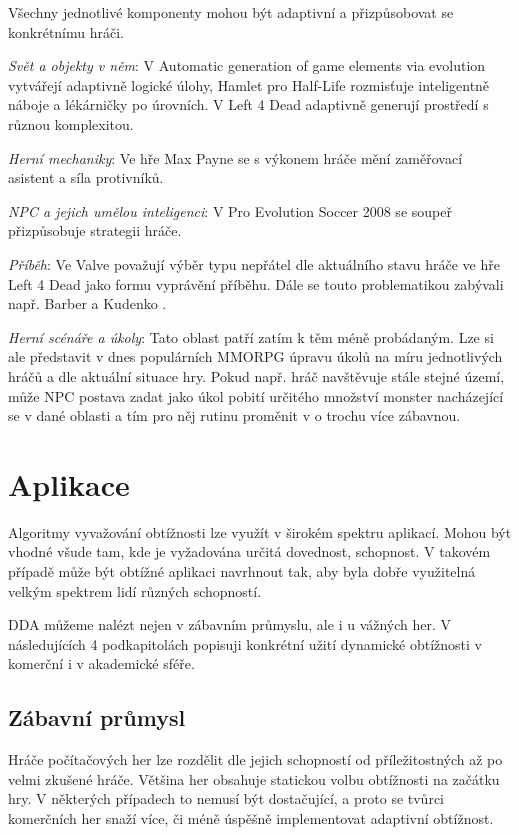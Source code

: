 Všechny jednotlivé komponenty mohou být adaptivní a přizpůsobovat se konkrétnímu hráči. 

\textit{Svět a objekty v něm}: V Automatic generation of game elements via evolution\cite{17Evol} vytvářejí adaptivně logické úlohy, Hamlet \cite{20Hun} pro Half-Life rozmisťuje inteligentně náboje a lékárničky po úrovních. V Left 4 Dead adaptivně generují prostředí s různou komplexitou. 

\textit{Herní mechaniky}: Ve hře Max Payne se s výkonem hráče mění zaměřovací asistent a síla protivníků\cite{RiskTakers}.  

\textit{NPC a jejich umělou inteligenci}: V Pro Evolution Soccer 2008 se soupeř přizpůsobuje strategii hráče\cite{6}. 

\textit{Příběh}: Ve Valve považují výběr typu nepřátel dle aktuálního stavu hráče ve hře Left 4 Dead jako formu vyprávění příběhu\cite{2}.  
Dále se touto problematikou zabývali např. Barber a Kudenko \cite{Narratives}. 

\textit{Herní scénáře a úkoly}: Tato oblast patří zatím k těm méně probádaným. Lze si ale představit v dnes populárních MMORPG úpravu úkolů na míru jednotlivých hráčů a dle aktuální situace hry. Pokud např. hráč navštěvuje stále stejné území, může NPC postava zadat jako úkol pobití určitého množství monster nacházející se v dané oblasti a tím pro něj rutinu proměnit v o trochu více zábavnou\cite{16Survey}. 

\section{Aplikace} \label{sec:aplikacedda}

Algoritmy vyvažování obtížnosti lze využít v širokém spektru aplikací. Mohou být vhodné všude tam, kde je vyžadována určitá dovednost, schopnost. V takovém případě může být obtížné aplikaci navrhnout tak, aby byla dobře využitelná velkým spektrem lidí různých schopností.

DDA můžeme nalézt nejen v zábavním průmyslu, ale i u vážných her. V následujících 4 podkapitolách popisuji konkrétní užití dynamické obtížnosti v komerční i v akademické sféře.

\subsection{Zábavní průmysl}

Hráče počítačových her lze rozdělit dle jejich schopností od příležitostných až po velmi zkušené hráče. Většina her obsahuje statickou volbu obtížnosti na začátku hry. V některých případech to nemusí být dostačující, a proto se tvůrci komerčních her snaží více, či méně úspěšně implementovat adaptivní obtížnost.

